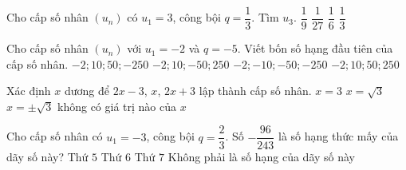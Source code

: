 \begin{ex}%
	Cho cấp số nhân $(u_n)$ có $u_1=3$,  công bội $q=\dfrac{1}{3}$. Tìm $u_3$.
	 \choice
		{$\dfrac{1}{9}$} 
		 {$\dfrac{1}{27}$}
		 {$\dfrac{1}{6}$}
		 {\True $\dfrac{1}{3}$}
\end{ex}

\begin{ex}%
	Cho cấp số nhân $\left(u_n\right)$ với $u_1=-2$ và $q=-5$. Viết  bốn số hạng đầu tiên của cấp số nhân.
	\choice 
		{$-2; 10; 50;-250$} 
		{\True $-2; 10;-50; 250$} 
		{$-2;-10;-50;-250$} 
		{$-2; 10;  50; 250$}
\end{ex}

\begin{ex}%
	Xác định $x$ dương để $2x - 3$, $x$, $2x + 3$ lập thành cấp số nhân. 
	\choice 
		 { $x = 3$ }
		{\True $x = \sqrt{3}$  }
		{  $x = \pm \sqrt{3}$ }
		{ không có  giá trị nào của $x$ }
\end{ex}

\begin{ex}%
	Cho cấp  số nhân có $u_1=-3$, công bội $q=\dfrac{2}{3}$. Số $-\dfrac{96}{243}$ là số hạng thức mấy của dãy số này?
	 \choice
		 {Thứ $5$}
		{\True Thứ $6$} 
		{Thứ $7$} 
		 {Không phải là số hạng của dãy số này}
\end{ex}

